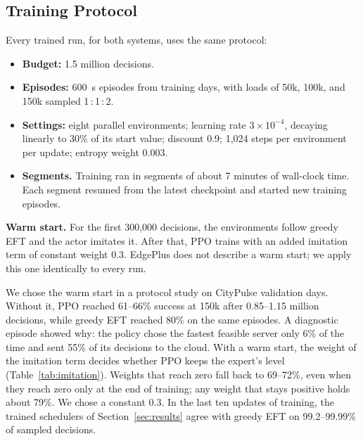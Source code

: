 \documentclass[11pt,journal,onecolumn]{IEEEtran}
\begin{document}
\subsection{Training Protocol}
\label{sec:training}
Every trained run, for both systems, uses the same protocol:
\begin{itemize}
\item \textbf{Budget:} 1.5 million decisions.
\item \textbf{Episodes:} 600~s episodes from training days, with loads of 50k, 100k, and 150k sampled 1\,:\,1\,:\,2.
\item \textbf{Settings:} eight parallel environments; learning rate $3\times10^{-4}$, decaying linearly to 30\% of its start value; discount 0.9; 1,024 steps per environment per update; entropy weight 0.003.
\item \textbf{Segments.} Training ran in segments of about 7 minutes of wall-clock time. Each segment resumed from the latest checkpoint and started new training episodes.
\end{itemize}

\textbf{Warm start.} For the first 300,000 decisions, the environments follow greedy EFT and the actor imitates it. After that, PPO trains with an added imitation term of constant weight 0.3. EdgePlus does not describe a warm start; we apply this one identically to every run.

We chose the warm start in a protocol study on CityPulse validation days. Without it, PPO reached 61--66\% success at 150k after 0.85--1.15 million decisions, while greedy EFT reached 80\% on the same episodes. A diagnostic episode showed why: the policy chose the fastest feasible server only 6\% of the time and sent 55\% of its decisions to the cloud. With a warm start, the weight of the imitation term decides whether PPO keeps the expert's level (Table~\ref{tab:imitation}). Weights that reach zero fall back to 69--72\%, even when they reach zero only at the end of training; any weight that stays positive holds about 79\%. We chose a constant 0.3. In the last ten updates of training, the trained schedulers of Section~\ref{sec:results} agree with greedy EFT on 99.2--99.99\% of sampled decisions.
\end{document}
